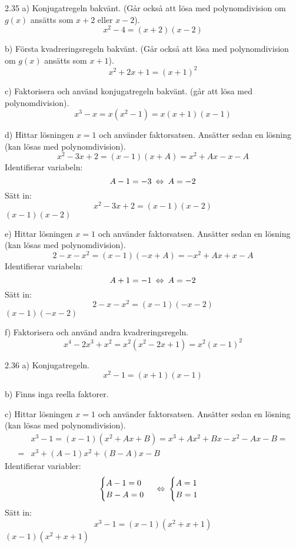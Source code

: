 \begin{task}{2.35 a)}
	Konjugatregeln bakvänt. (Går också att lösa med polynomdivision om $g(x)$ ansätts som $x+2$ eller $x-2$).
	\[x^2-4=(x+2)(x-2)\]
\end{task}

\begin{task}{b)}
	Första kvadreringsregeln bakvänt. (Går också att lösa med polynomdivision om $g(x)$ ansätts som $x+1$).
	\[x^2+2x+1=(x+1)^2\]
\end{task}

\begin{task}{c)}
	Faktorisera och använd konjugatregeln bakvänt. (går att lösa med polynomdivision).
	\[x^3-x=x(x^2-1)=x(x+1)(x-1)\]
\end{task}

\begin{task}{d)}
	Hittar lösningen $x=1$ och använder faktorsatsen. Ansätter sedan en lösning (kan lösas med polynomdivision).
	\[x^2-3x+2=(x-1)(x+A)=x^2+Ax-x-A\]
	Identifierar variabeln:
	\[A-1=-3 \lra A=-2\]
	Sätt in:
	\[x^2-3x+2=(x-1)(x-2)\]
	\ans $(x-1)(x-2)$
\end{task}

\begin{task}{e)}
	Hittar lösningen $x=1$ och använder faktorsatsen. Ansätter sedan en lösning (kan lösas med polynomdivision).
	\[2-x-x^2=(x-1)(-x+A)=-x^2+Ax+x-A\]
	Identifierar variabeln:
	\[A+1=-1 \lra A=-2\]
	Sätt in:
	\[2-x-x^2=(x-1)(-x-2)\]
	\ans $(x-1)(-x-2)$
\end{task}

\begin{task}{f)}
	Faktorisera och använd andra kvadreringsregeln.
	\[x^4-2x^3+x^2=x^2(x^2-2x+1)=x^2(x-1)^2\]
\end{task}

\begin{task}{2.36 a)}
	Konjugatregeln.
	\[x^2-1=(x+1)(x-1)\]
\end{task}

\begin{task}{b)}
	Finns inga reella faktorer.
\end{task}

\begin{task}{c)}
	Hittar lösningen $x=1$ och använder faktorsatsen. Ansätter sedan en lösning (kan lösas med polynomdivision).
	\begin{align*}
	&x^3-1=(x-1)(x^2+Ax+B)=x^3+Ax^2+Bx-x^2-Ax-B= \\ =
	&x^3+(A-1)x^2+(B-A)x-B
	\end{align*}
	Identifierar variabler:
	\[\begin{cases}
	A-1=0 \\
	B-A=0
	\end{cases}
	\lra
	\begin{cases}
	A=1 \\
	B=1
	\end{cases}\]
	Sätt in:
	\[x^3-1=(x-1)(x^2+x+1)\]
	\ans $(x-1)(x^2+x+1)$
\end{task}

